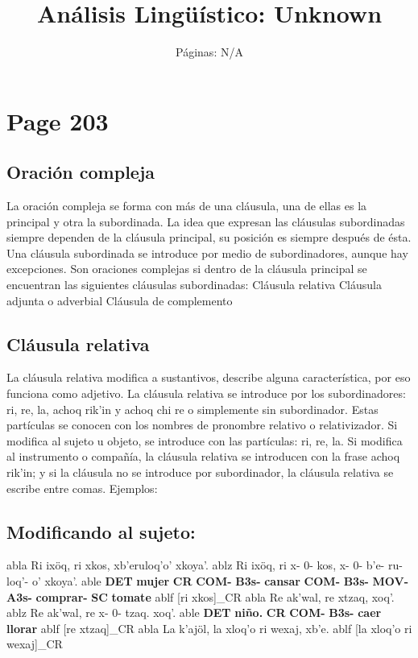 \documentclass{article}%
\title{Análisis Lingüístico: Unknown}%
\author{Páginas: N/A}%
\begin{document}
%
\normalsize%
\maketitle%
\section{Page 203}%
\label{sec:Page203}%

%
\subsection{Oración compleja}%
\label{subsec:Oracincompleja}%

%
La oración compleja se forma con más de una cláusula, una de ellas es la principal y %
otra la subordinada. La idea que expresan las cláusulas subordinadas siempre dependen %
de la cláusula principal, su posición es siempre después de ésta. Una cláusula subordinada %
se introduce por medio de subordinadores, aunque hay excepciones. Son oraciones %
complejas si dentro de la cláusula principal se encuentran las siguientes cláusulas %
subordinadas: %
Cláusula relativa %
Cláusula adjunta o adverbial %
Cláusula de complemento %
\subsection{Cláusula relativa}%
\label{subsec:Clusularelativa}%

%
La cláusula relativa modifica a sustantivos, describe alguna característica, por eso %
funciona como adjetivo. La cláusula relativa se introduce por los subordinadores: ri, %
re, la, achoq rik'in y achoq chi re o simplemente sin subordinador. Estas partículas se %
conocen con los nombres de pronombre relativo o relativizador. Si modifica al sujeto u %
objeto, se introduce con las partículas: ri, re, la. Si modifica al instrumento o compañía, %
la cláusula relativa se introducen con la frase achoq rik'in; y si la cláusula no se %
introduce por subordinador, la cláusula relativa se escribe entre comas. Ejemplos: %
\subsection{Modificando al sujeto:}%
\label{subsec:Modificandoalsujeto}%

%
\ex
  	abla Ri ixöq, ri xkos, xb'eruloq'o' xkoya'.
  	ablz Ri ixöq, ri x- 0- kos, x- 0- b'e- ru- loq'- o' xkoya'.
  	able \textbf{DET} \textbf{mujer} \textbf{CR} \textbf{COM-} \textbf{B3s-} \textbf{cansar} \textbf{COM-} \textbf{B3s-} \textbf{MOV-} \textbf{A3s-} \textbf{comprar-} \textbf{SC} \textbf{tomate}
  	ablf [ri xkos]_{CR}
\ex
  	abla Re ak'wal, re xtzaq, xoq'.
  	ablz Re ak'wal, re x- 0- tzaq. xoq'.
  	able \textbf{DET} \textbf{niño.} \textbf{CR} \textbf{COM-} \textbf{B3s-} \textbf{caer} \textbf{llorar}
  	ablf [re xtzaq]_{CR}
\ex
  	abla La k'ajöl, la xloq'o ri wexaj, xb'e.
  	ablf [la xloq'o ri wexaj]_{CR}
\end{document}
